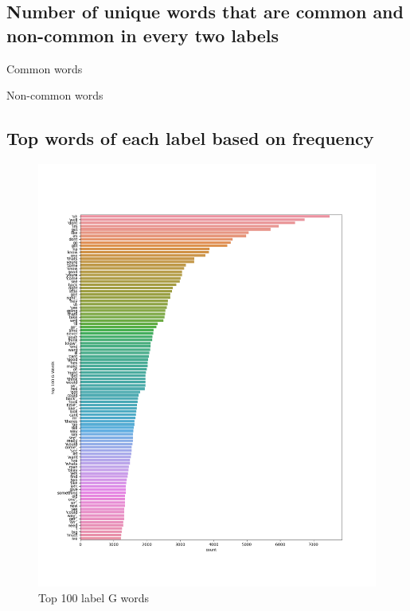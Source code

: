 \documentclass[a4paper]{article}
\begin{document}
\FloatBarrier

\subsection*{Number of unique words that are common and non-common in every two labels}

\begin{table}[ht]
    \centering
    \caption{Common words}
    \label{tab:common_words}
\end{table}

\begin{table}[ht]
    \centering

    \caption{Non-common words}
    \label{tab:non_common_words}
\end{table}

\FloatBarrier

\subsection*{Top words of each label based on frequency}

\begin{figure}[ht]
    \centering
    \includegraphics[width=1\textwidth]{../stats/top_100_G_words.png}
    \caption{Top 100 label G words}
\end{figure}
\end{document}
